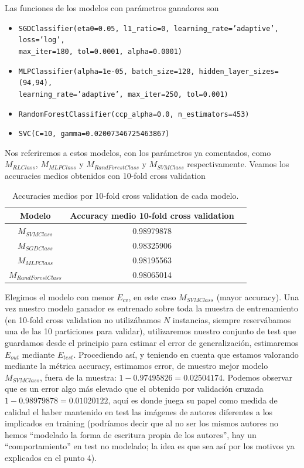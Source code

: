 \documentclass[11pt,a4paper]{article}
\theoremstyle{definition}
\begin{document}
	Las funciones de los modelos con parámetros ganadores son 
	\begin{itemize}
		\item \texttt{SGDClassifier(eta0=0.05, l1\_ratio=0, learning\_rate='adaptive', loss='log',\\ max\_iter=180, tol=0.0001, alpha=0.0001)}
		\item \texttt{MLPClassifier(alpha=1e-05, batch\_size=128, hidden\_layer\_sizes=(94,94),\\ learning\_rate='adaptive', max\_iter=250, tol=0.001)}
		\item \texttt{RandomForestClassifier(ccp\_alpha=0.0, n\_estimators=453)}
		\item \texttt{SVC(C=10, gamma=0.02007346725463867)}
	\end{itemize}
	Nos referiremos a estos modelos, con los parámetros ya comentados, como $M_{RLClass}$, $M_{MLPClass}$ y $M_{RandForestClass}$ y $M_{SVMClass}$ respectivamente. Veamos los accuracies medios obtenidos con 10-fold cross validation

	\begin{table}[H]
	\begin{center}
	\begin{tabular}{|c|c|c|}
	\hline
	 Modelo & Accuracy medio 10-fold cross validation \\
	\hline \hline
	$M_{SVMClass}$ & 0.98979878 \\ \hline
	$M_{SGDClass}$ & 0.98325906\\ \hline
	$M_{MLPClass}$ & 0.98195563 \\ \hline
	$M_{RandForestClass}$ & 0.98065014  \\ \hline
	\end{tabular}
	\caption{Accuracies medios por 10-fold cross validation de cada modelo.}
	\label{tabla:sencilla}
	\end{center}
	\end{table}
	Elegimos el modelo con menor $E_{cv}$, en este caso $M_{SVMClass}$ (mayor accuracy). Una vez nuestro modelo ganador es entrenado sobre toda la muestra de entrenamiento (en 10-fold cross validation no utilizábamos $N$ instancias, siempre reservábamos una de las 10 particiones para validar), utilizaremos nuestro conjunto de test que guardamos desde el principio para estimar el error de generalización, estimaremos $E_{out}$ mediante $E_{test}$. Procediendo así, y teniendo en cuenta que estamos valorando mediante la métrica accuracy, estimamos error, de muestro mejor modelo $M_{SVMClass}$, fuera de la muestra: $1-0.97495826 = 0.02504174$. Podemos observar que es un error algo más elevado que el obtenido por validación cruzada $1-0.98979878 = 0.01020122$, aquí es donde juega su papel como medida de calidad el haber mantenido en test las imágenes de autores diferentes a los implicados en training (podríamos decir que al no ser los mismos autores no hemos ``modelado la forma de escritura propia de los autores'', hay un ``comportamiento'' en test no modelado; la idea es que sea así por los motivos ya explicados en el punto 4).\\
	
\end{document}

